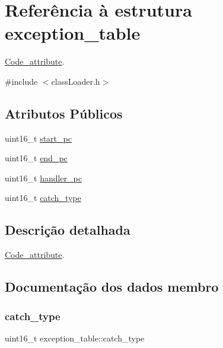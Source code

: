 \hypertarget{structexception__table}{}\section{Referência à estrutura exception\+\_\+table}
\label{structexception__table}


\hyperlink{struct_code__attribute}{Code\+\_\+attribute}.  




{\ttfamily \#include $<$class\+Loader.\+h$>$}

\subsection*{Atributos Públicos}
\begin{DoxyCompactItemize}
\item 
uint16\+\_\+t \hyperlink{structexception__table_af5b06605eecd81fe73512c8fd001cfd1}{start\+\_\+pc}
\item 
uint16\+\_\+t \hyperlink{structexception__table_a89ade5c549c9ef70d35df9601c71f6e6}{end\+\_\+pc}
\item 
uint16\+\_\+t \hyperlink{structexception__table_a3e662a079f9184d56df7e26c268bc271}{handler\+\_\+pc}
\item 
uint16\+\_\+t \hyperlink{structexception__table_abb24ce48092e41e0cc5249d0c957fa94}{catch\+\_\+type}
\end{DoxyCompactItemize}


\subsection{Descrição detalhada}
\hyperlink{struct_code__attribute}{Code\+\_\+attribute}. 

\subsection{Documentação dos dados membro}
\hypertarget{structexception__table_abb24ce48092e41e0cc5249d0c957fa94}{}\label{structexception__table_abb24ce48092e41e0cc5249d0c957fa94} 
\subsubsection{\texorpdfstring{catch\+\_\+type}{catch\_type}}
{\footnotesize\ttfamily uint16\+\_\+t exception\+\_\+table\+::catch\+\_\+type}

